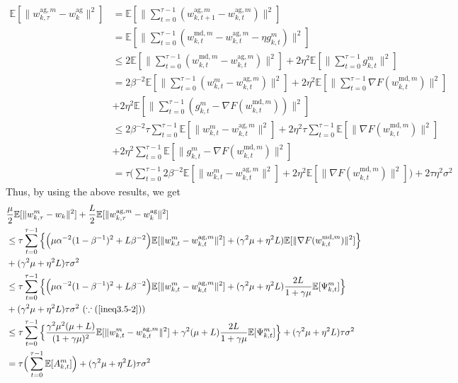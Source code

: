 \begin{align*}
    \mathbb{E}[\|w_{k, \tau}^{\textrm{ag}, m} - w_k^{\textrm{ag}}\|^2] &= \mathbb{E}[\|\sum_{t=0}^{\tau-1}(w_{k, t+1}^{\textrm{ag}, m}-w_{k, t}^{\textrm{ag}, m})\|^2] \\
    &= \mathbb{E}[\|\sum_{t=0}^{\tau-1}(w_{k, t}^{\textrm{md}, m}-w_{k, t}^{\textrm{ag}, m}-\eta g_{k, t}^m)\|^2]\\
    &\leq 2\mathbb{E}[\|\sum_{t=0}^{\tau-1}(w_{k, t}^{\textrm{md}, m} - w_{k, t}^{\textrm{ag}, m})\|^2] + 2\eta^2\mathbb{E}[\|\sum_{t=0}^{\tau-1}g_{k, t}^m\|^2]\\
    &= 2\beta^{-2}\mathbb{E}[\|\sum_{t=0}^{\tau-1}(w_{k, t}^m - w_{k, t}^{\textrm{ag}, m})\|^2] + 2\eta^2\mathbb{E}[\|\sum_{t=0}^{\tau-1}\nabla F(w_{k, t}^{\textrm{md}, m})\|^2] \\
    &+ 2\eta^2\mathbb{E}[\|\sum_{t=0}^{\tau-1}(g_{k, t}^m - \nabla F(w_{k, t}^{\textrm{md}, m}))\|^2]\\
    &\leq 2\beta^{-2}\tau\sum_{t=0}^{\tau-1}\mathbb{E}[\|w_{k, t}^m-w_{k, t}^{\textrm{ag}, m}\|^2] + 2\eta^2\tau\sum_{t=0}^{\tau-1}\mathbb{E}[\|\nabla F(w_{k, t}^{\textrm{md}, m})\|^2]\\
    &+ 2\eta^2\sum_{t=0}^{\tau-1}\mathbb{E}[\|g_{k, t}^m - \nabla F(w_{k, t}^{\textrm{md}, m})\|^2]\\
    &= \tau \Big(\sum_{t=0}^{\tau-1} 2\beta^{-2}\mathbb{E}[\|w_{k, t}^m - w_{k, t}^{\textrm{ag}, m}\|^2] + 2\eta^2\mathbb{E}[\|\nabla F(w_{k, t}^{\textrm{md}, m})\|^2]\Big) +2\tau\eta^2\sigma^2
\end{align*}
Thus, by using the above results, we get
\begin{align*}
    &\frac{\mu}{2}\mathbb{E}[\|w_{k, \tau}^m - w_k\|^2] + \frac{L}{2} \mathbb{E}[\|w_{k, \tau}^{\textrm{ag}, m} - w_k^{\textrm{ag}}\|^2] \\
    &\leq \tau \sum_{t=0}^{\tau-1} \Big\{ \Big(\mu\alpha^{-2}(1-\beta^{-1})^2 + L\beta^{-2}\Big)\mathbb{E}[\|w_{k, t}^m - w_{k, t}^{\textrm{ag}, m}\|^2] + (\gamma^2\mu + \eta^2 L)\mathbb{E}[\|\nabla F(w_{k, t}^{\textrm{md}, m})\|^2]\Big\} \\
    &+ (\gamma^2\mu+\eta^2 L)\tau\sigma^2 \\
    &\leq \tau \sum_{t=0}^{\tau-1} \Big\{ \Big(\mu\alpha^{-2}(1-\beta^{-1})^2 + L\beta^{-2}\Big)\mathbb{E}[\|w_{k, t}^m - w_{k, t}^{\textrm{ag}, m}\|^2] + (\gamma^2\mu + \eta^2 L)\frac{2L}{1+\gamma\mu}\mathbb{E}[\Psi_{k, t}^m]\Big\} \\
    &+ (\gamma^2\mu+\eta^2 L)\tau\sigma^2 \textrm{ }(\because (\ref{ineq3.5-2})) \\
    &\leq \tau \sum_{t=0}^{\tau-1} \Big\{ \frac{\gamma^2\mu^2(\mu+L)}{(1+\gamma\mu)^2}\mathbb{E}[\|w_{k, t}^m - w_{k, t}^{\textrm{ag}, m}\|^2] + \gamma^2(\mu+L)\frac{2L}{1+\gamma\mu}\mathbb{E}[\Psi_{k, t}^m]\Big\} + (\gamma^2\mu+\eta^2 L)\tau\sigma^2 \\
    &= \tau \Big( \sum_{t=0}^{\tau-1} \mathbb{E}[A_{k, t}^m]\Big) + (\gamma^2\mu+\eta^2 L)\tau\sigma^2
\end{align*}
